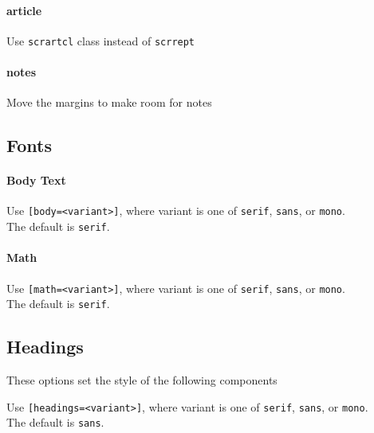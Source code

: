 \documentclass[solid,math,chem,code,plot,gloss]{bmc}
\begin{document}
\paragraph{\ttfamily article}
Use \texttt{scrartcl} class instead of \texttt{scrrept}
\paragraph{\ttfamily notes}
Move the margins to make room for notes

\subsection{Fonts}
\paragraph{Body Text}
Use \texttt{[body=<variant>]}, where variant is one of  \texttt{serif}, \texttt{sans}, or \texttt{mono}.
\\The default is \texttt{serif}.

\paragraph{Math}
Use \texttt{[math=<variant>]}, where variant is one of  \texttt{serif}, \texttt{sans}, or \texttt{mono}.
\\The default is \texttt{serif}.

\subsection{Headings}

These options set the style of the following components

Use \texttt{[headings=<variant>]}, where variant is one of  \texttt{serif}, \texttt{sans}, or \texttt{mono}.
\\The default is \texttt{sans}.
\end{document}
